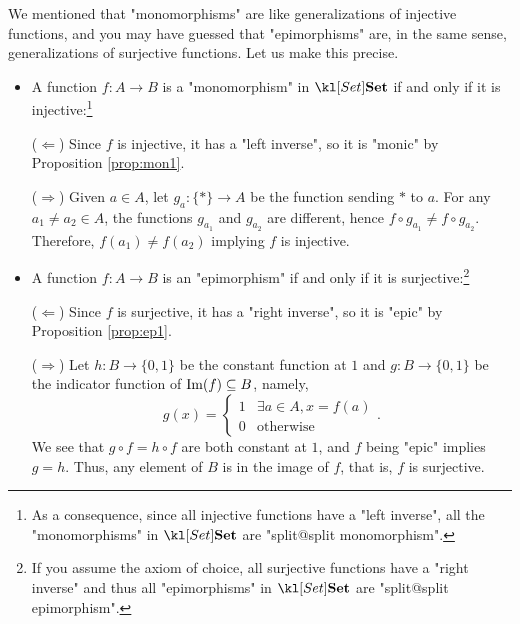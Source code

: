 \documentclass[main.tex]{subfiles}
\begin{document}
\begin{exmp}[$\catSet$]\label{exmp:monicset}
	We mentioned that "monomorphisms" are like generalizations of injective functions, and you may have guessed that "epimorphisms" are, in the same sense, generalizations of surjective functions. Let us make this precise.
	\begin{itemize}
		\item A function $f:A\rightarrow B$ is a "monomorphism" in $\catSet$ if and only if it is injective:\footnote{As a consequence, since all injective functions have a "left inverse", all the "monomorphisms" in $\catSet$ are "split@split monomorphism".}
		
		($\Leftarrow$) Since $f$ is injective, it has a "left inverse", so it is "monic" by Proposition \ref{prop:mon1}.
		
		($\Rightarrow$) Given $a \in A$, let $g_a: \{\ast\} \rightarrow A$ be the function sending $\ast$ to $a$. For any $a_1 \neq a_2 \in A$, the functions $g_{a_1}$ and $g_{a_2}$ are different, hence $f \circ g_{a_1} \neq f \circ g_{a_2}$. Therefore, $f(a_1) \neq f(a_2)$ implying $f$ is injective.
		
		\item A function $f:A\rightarrow B$ is an "epimorphism" if and only if it is surjective:\footnote{If you assume the axiom of choice, all surjective functions have a "right inverse" and thus all "epimorphisms" in $\catSet$ are "split@split epimorphism".}
		
		($\Leftarrow$) Since $f$ is surjective, it has a "right inverse", so it is "epic" by Proposition \ref{prop:ep1}.
		
		($\Rightarrow$) Let $h: B \rightarrow \{0,1\}$ be the constant function at $1$ and $g:B \rightarrow \{0,1\}$ be the indicator function of $\operatorname{Im}(f) \subseteq B$, namely, \[g(x) = \begin{cases}1&\exists a \in A, x = f(a)\\0&\text{otherwise}\end{cases}.\]
		We see that $g \circ f = h\circ f$ are both constant at $1$, and $f$ being "epic" implies $g = h$. Thus, any element of $B$ is in the image of $f$, that is, $f$ is surjective.
	\end{itemize}
\end{exmp}
\end{document}
